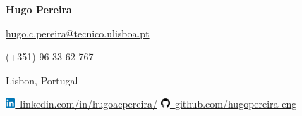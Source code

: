 \documentclass[a4paper,12pt]{article}
\begin{document}
\begin{minipage}{6.5cm}
\vspace{-1.5em}
\hspace{0.5cm}
\end{minipage}
\begin{minipage}{10.5cm}
\vspace{-1em}
\centerline{\Huge \textbf{Hugo Pereira}}
\vspace{8pt}
\centerline{\large \href{mailto:hugo.c.pereira@tecnico.ulisboa.pt}{hugo.c.pereira@tecnico.ulisboa.pt}}
\centerline{\large (+351) 96 33 62 767}
\centerline{\large Lisbon, Portugal} 
\vspace{8pt}
\href{https://www.linkedin.com/in/hugoacpereira/}{\includegraphics[height=10pt]{Images/linkedin}~\footnotesize{linkedin.com/in/hugoacpereira/}}
\quad
\href{https://github.com/hugopereira-eng}{\includegraphics[height=10pt]{Images/github}~\footnotesize{github.com/hugopereira-eng}} 
\end{minipage} 
\end{document}
